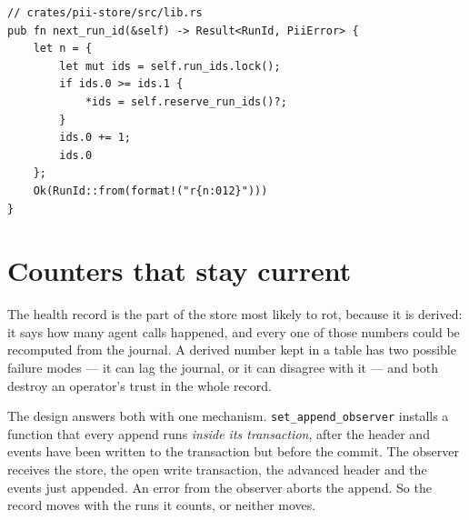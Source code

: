 \begin{lstlisting}[basicstyle=\ttfamily\footnotesize]
// crates/pii-store/src/lib.rs
pub fn next_run_id(&self) -> Result<RunId, PiiError> {
    let n = {
        let mut ids = self.run_ids.lock();
        if ids.0 >= ids.1 {
            *ids = self.reserve_run_ids()?;
        }
        ids.0 += 1;
        ids.0
    };
    Ok(RunId::from(format!("r{n:012}")))
}
\end{lstlisting}

\section{Counters that stay current}

The health record is the part of the store most likely to rot, because it is derived: it says
how many agent calls happened, and every one of those numbers could be recomputed from the
journal. A derived number kept in a table has two possible failure modes --- it can lag the
journal, or it can disagree with it --- and both destroy an operator's trust in the whole
record.

The design answers both with one mechanism. \texttt{set\_append\_observer} installs a function
that every append runs \emph{inside its transaction}, after the header and events have been
written to the transaction but before the commit. The observer receives the store, the open
write transaction, the advanced header and the events just appended. An error from the
observer aborts the append. So the record moves with the runs it counts, or neither moves.

\begin{center}
\end{center}

